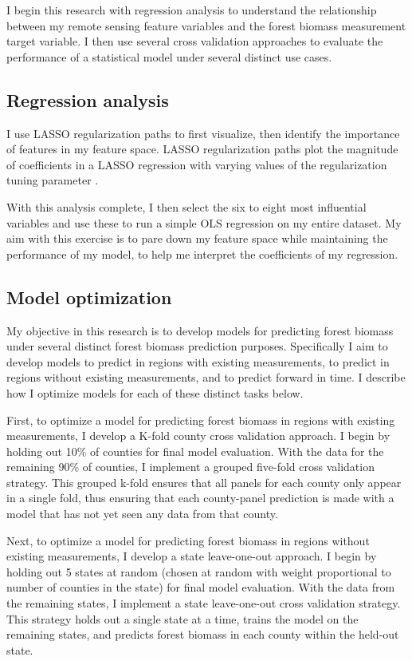 \documentclass{article}
\begin{document}
I begin this research with regression analysis to understand the relationship between my remote sensing feature variables and the forest biomass measurement target variable. I then use several cross validation approaches to evaluate the performance of a statistical model under several distinct use cases.

\subsection{Regression analysis}
I use LASSO regularization paths to first visualize, then identify the importance of features in my feature space. LASSO regularization paths plot the magnitude of coefficients in a LASSO regression with varying values of the regularization tuning parameter \cite{hastietibs}. 

With this analysis complete, I then select the six to eight most influential variables and use these to run a simple OLS regression on my entire dataset. My aim with this exercise is to pare down my feature space while maintaining the performance of my model, to help me interpret the coefficients of my regression.

\subsection{Model optimization}
My objective in this research is to develop models for predicting forest biomass under several distinct forest biomass prediction purposes. Specifically I aim to develop models to predict in regions with existing measurements, to predict in regions without existing measurements, and to predict forward in time. I describe how I optimize models for each of these distinct tasks below.

First, to optimize a model for predicting forest biomass in regions with existing measurements, I develop a K-fold county cross validation approach. I begin by holding out 10\% of counties for final model evaluation. With the data for the remaining 90\% of counties, I implement a grouped five-fold cross validation strategy. This grouped k-fold ensures that all panels for each county only appear in a single fold, thus ensuring that each county-panel prediction is made with a model that has not yet seen any data from that county.

Next, to optimize a model for predicting forest biomass in regions without existing measurements, I develop a state leave-one-out approach. I begin by holding out 5 states at random (chosen at random with weight proportional to number of counties in the state) for final model evaluation. With the data from the remaining states, I implement a state leave-one-out cross validation strategy. This strategy holds out a single state at a time, trains the model on the remaining states, and predicts forest biomass in each county within the held-out state. 
\end{document}
